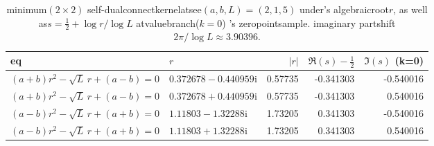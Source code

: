 \begin{table}[H]
\centering
\small
\begin{tabular}{l l r r r}
\toprule
eq & $r$ & $|r|$ & $\Re(s)-\tfrac12$ & $\Im(s)$ (k=0)\\
\midrule
$(a+b)r^2-\sqrt{L}\,r+(a-b)=0$ & $0.372678-0.440959\mathrm{i}$ & 0.57735 & -0.341303 & -0.540016\\
$(a+b)r^2-\sqrt{L}\,r+(a-b)=0$ & $0.372678+0.440959\mathrm{i}$ & 0.57735 & -0.341303 & 0.540016\\
$(a-b)r^2-\sqrt{L}\,r+(a+b)=0$ & $1.11803-1.32288\mathrm{i}$ & 1.73205 & 0.341303 & -0.540016\\
$(a-b)r^2-\sqrt{L}\,r+(a+b)=0$ & $1.11803+1.32288\mathrm{i}$ & 1.73205 & 0.341303 & 0.540016\\
\bottomrule
\end{tabular}
\caption{minimum$(2\times2)$ self-dualconnectkernelatsee$(a,b,L)=(2,1,5)$ under's algebraicroot$r$, as well as$s=\tfrac12+\log r/\log L$ atvaluebranch($k=0$) 's zeropointsample. imaginary partshift$2\pi/\log L\approx 3.90396$.}
\label{tab:xi-2x2-selfdual-offcritical-template}
\end{table}
